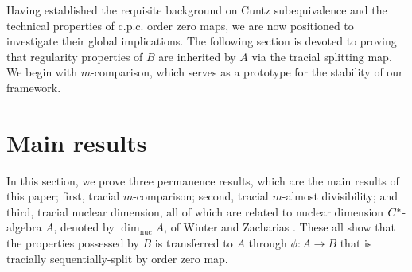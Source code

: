 \documentclass[12pt]{amsart}
\theoremstyle{plain}
\theoremstyle{definition}
\def\dim{\operatorname{dim}}
\def\nuc{\operatorname{nuc}}
\numberwithin{equation}{section}
\begin{document}
Having established the requisite background on Cuntz subequivalence and the technical properties of c.p.c. order zero maps, we are now positioned to investigate their global implications. The following section is devoted to proving that regularity properties of $B$ are inherited by $A$ via the tracial splitting map. We begin with $m$-comparison, which serves as a prototype for the stability of our framework.

\section{Main results}\label{S:3}

In this section, we prove three permanence results, which are the main results of this paper; first, tracial $m$-comparison; second, tracial $m$-almost divisibility; and third, tracial nuclear dimension,  all of which are related to nuclear dimension $C\sp*$-algebra $A$, denoted by $\dim_{\nuc}A$, of Winter and Zacharias \cite{WZ2010}. These all show that the properties possessed by $B$ is transferred to $A$ through $\phi:A \to B$ that is tracially sequentially-split by order zero map. 
   
\end{document}
